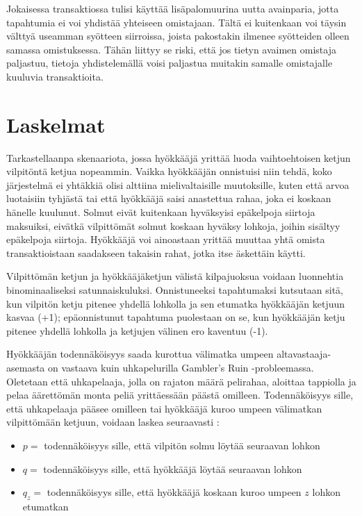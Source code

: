 \documentclass{article}
\begin{document}
Jokaisessa transaktiossa tulisi käyttää lisäpalomuurina uutta avainparia, jotta tapahtumia ei voi yhdistää yhteiseen omistajaan. Tältä ei kuitenkaan voi täysin välttyä useamman syötteen siirroissa, joista pakostakin ilmenee syöt\-tei\-den olleen samassa omistuksessa. Tähän liittyy se riski, että jos tietyn avaimen omistaja paljastuu, tietoja yhdistelemällä voisi paljastua muitakin samalle omistajalle kuuluvia transaktioita.

\section{Laskelmat}

Tarkastellaanpa skenaariota, jossa hyökkääjä yrittää luoda vaihtoehtoisen ketjun vilpitöntä ketjua nopeammin. Vaikka hyökkääjän onnistuisi niin tehdä, koko järjestelmä ei yhtäkkiä olisi alttiina mielivaltaisille muutoksille, kuten että arvoa luotaisiin tyhjästä tai että hyökkääjä saisi anastettua rahaa, joka ei koskaan hänelle kuulunut. Solmut eivät kuitenkaan hyväksyisi epäkelpoja siirtoja maksuiksi, eivätkä vilpittömät solmut koskaan hyväksy lohkoja, joihin sisältyy epäkelpoja siirtoja. Hyökkääjä voi ainoastaan yrittää muuttaa yhtä omista transaktioistaan saadakseen takaisin rahat, jotka itse äskettäin käytti.

Vilpittömän ketjun ja hyökkääjäketjun välistä kilpajuoksua voidaan luonnehtia binominaaliseksi satunnaiskuluksi. Onnistuneeksi tapahtumaksi kutsutaan sitä, kun vilpitön ketju pitenee yhdellä lohkolla ja sen etumatka hyökkääjän ketjuun kasvaa (+1); epäonnistunut tapahtuma puolestaan on se, kun hyök\-kää\-jän  ketju pitenee yhdellä lohkolla ja ketjujen välinen ero kaventuu (-1).

Hyökkääjän todennäköisyys saada kurottua välimatka umpeen altavastaaja-asemasta on vastaava kuin uhkapelurilla Gambler's Ruin -probleemassa. Oletetaan että uhkapelaaja, jolla on rajaton määrä pelirahaa, aloittaa tappiolla ja pelaa äärettömän monta peliä yrittäessään päästä omilleen. Todennäköisyys sille, että uhkapelaaja pääsee omilleen tai hyökkääjä kuroo umpeen välimatkan vilpittömään ketjuun, voidaan laskea seuraavasti \cite{8}:
\begin{itemize}
    \item[] $p =$ todennäköisyys sille, että vilpitön solmu löytää seuraavan lohkon
    \item[] $q =$ todennäköisyys sille, että hyökkääjä löytää seuraavan lohkon
    \item[] $q_{z} =$ todennäköisyys sille, että hyökkääjä koskaan kuroo umpeen $z$ lohkon etumatkan
\end{itemize}
\end{document}
